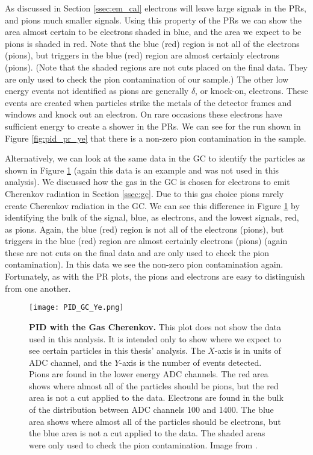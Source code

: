 As discussed in Section \ref{ssec:em_cal} electrons will leave large signals in the PRs, and pions much smaller signals. Using this property of the PRs we can show the area almost certain to be electrons shaded in blue, and the area we expect to be pions is shaded in red. Note that the blue (red) region is not all of the electrons (pions), but triggers in the blue (red) region are almost certainly electrons (pions). (Note that the shaded regions are not cuts placed on the final data. They are only used to check the pion contamination of our sample.) The other low energy events not identified as pions are generally $\delta$, or knock-on, electrons. These events are created when particles strike the metals of the detector frames and windows and knock out an electron. On rare occasions these electrons have sufficient energy to create a shower in the PRs. We can see for the run shown in Figure \ref{fig:pid_pr_ye} that there is a non-zero pion contamination in the sample. 

Alternatively, we can look at the same data in the GC to identify the particles as shown in Figure \ref{fig:pid_gc_ye} (again this data is an example and was not used in this analysis). We discussed how the gas in the GC is chosen for electrons to emit Cherenkov radiation in Section \ref{ssec:gc}. Due to this gas choice pions rarely create Cherenkov radiation in the GC. We can see this difference in Figure \ref{fig:pid_gc_ye} by identifying the bulk of the signal, blue, as electrons, and the lowest signals, red, as pions. Again, the blue (red) region is not all of the electrons (pions), but triggers in the blue (red) region are almost certainly electrons (pions) (again these are not cuts on the final data and are only used to check the pion contamination). In this data we see the non-zero pion contamination again. Fortunately, as with the PR plots, the pions and electrons are easy to distinguish from one another.

\begin{figure}[!ht]
\begin{center}
\texttt{[image: PID\_GC\_Ye.png]}
\end{center}
\caption[PID with the Gas Cherenkov]{
{\bf{PID with the Gas Cherenkov.}} This plot does not show the data used in this analysis. It is intended only to show where we expect to see certain particles in this thesis' analysis. The $X$-axis is in units of ADC channel, and the $Y$-axis is the number of events detected. Pions are found in the lower energy ADC channels. The red area shows where almost all of the particles should be pions, but the red area is not a cut applied to the data. Electrons are found in the bulk of the distribution between ADC channels 100 and 1400. The blue area shows where almost all of the particles should be electrons, but the blue area is not a cut applied to the data. The shaded areas were only used to check the pion contamination. Image from \cite{Thesis:Ye}.}
\label{fig:pid_gc_ye}
\end{figure}

